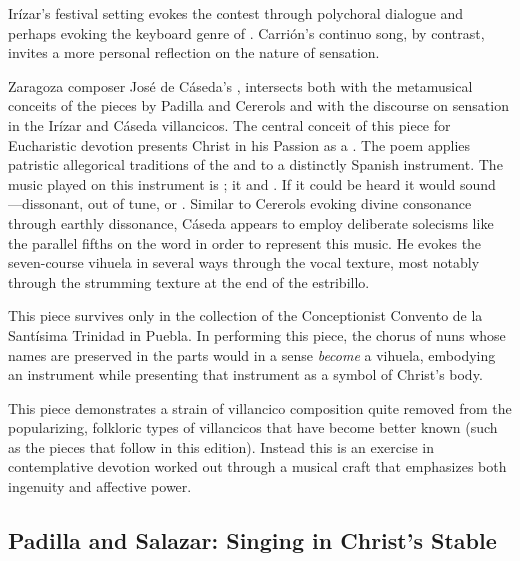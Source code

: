 Irízar's festival setting evokes the contest through polychoral dialogue and perhaps evoking the keyboard genre of .
Carrión's continuo song, by contrast, invites a more personal reflection on the nature of sensation.

Zaragoza composer José de Cáseda's , intersects both with the metamusical conceits of the pieces by Padilla and Cererols and with the discourse on sensation in the Irízar and Cáseda villancicos.
The central conceit of this piece for Eucharistic devotion presents Christ in his Passion as a .
The poem applies patristic allegorical traditions of the  and  to a distinctly Spanish instrument.
The music played on this instrument is ; it  and .
If it could be heard it would sound ---dissonant, out of tune, or . 
Similar to Cererols evoking divine consonance through earthly dissonance, Cáseda appears to employ deliberate solecisms like the parallel fifths on the word  in order to represent this  music.
He evokes the seven-course vihuela in several ways through the vocal texture, most notably through the strumming texture at the end of the estribillo.

This piece survives only in the collection of the Conceptionist Convento de la Santísima Trinidad in Puebla.
In performing this piece, the chorus of nuns whose names are preserved in the parts would in a sense \emph{become} a vihuela, embodying an instrument while presenting that instrument as a symbol of Christ's body.

This piece demonstrates a strain of villancico composition quite removed from the popularizing, folkloric types of villancicos that have become better known (such as the pieces that follow in this edition).
Instead this is an exercise in contemplative devotion worked out through a musical craft that emphasizes both ingenuity and affective power.

\subsection{Padilla and Salazar: Singing in Christ's Stable}

